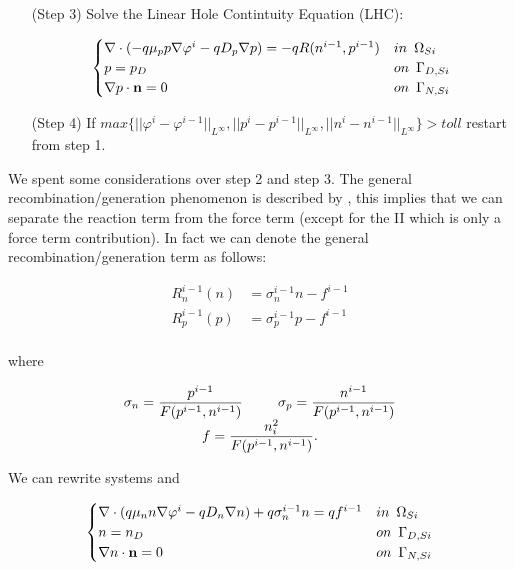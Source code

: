 \begin{itemize}
\item[(Step 3)] Solve the Linear Hole Contintuity Equation (LHC):

\begin{equation}
\label{eq: LHC system}
\begin{cases}
\nabla \cdot (- q\mu_p p \nabla \varphi^i - qD_p \nabla p ) =  -qR(n^{i-1},p^{i-1}) & in \psp{3} \Omega_{Si}
\\
 p = p_D & on \psp{3} \Gamma_{D,Si}
 \\
 \nabla p \cdot \vect{n} = 0 & on \psp{3} \Gamma_{N,Si}
\end{cases}
\end{equation}

\item[(Step 4)] If $max\{||\varphi^i-\varphi^{i-1}||_{L^{\infty}},||p^i-p^{i-1}||_{L^{\infty}},||n^i-n^{i-1}||_{L^{\infty}}\}>toll$ restart from step 1.


\end{itemize}

We spent some considerations over step 2 and step 3. The general recombination/generation phenomenon is described by , this implies that we can separate the reaction term from the force term (except for the II which is only a force term contribution). In fact we can denote the general recombination/generation term as follows:

\begin{equation}
\label{eq: real Rn and Rp}
\begin{array}{rcl}
R_n^{i-1}(n) & = \sigma_n^{i-1} n - f^{i-1} \\
R_p^{i-1}(p) & = \sigma_p^{i-1} p - f^{i-1} \\
\end{array}
\end{equation}

where


\begin{equation}
\begin{array}{c}
\sigma_n  = \dfrac{p^{i-1}}{F(p^{i-1},n^{i-1})} \psp{15} \sigma_p   = \dfrac{n^{i-1}}{F(p^{i-1},n^{i-1})} \\
f  = \dfrac{n_i^2}{F(p^{i-1},n^{i-1})}.
\end{array}
\end{equation}

We can rewrite systems  and 

\begin{equation}
\label{eq: LEC system new}
\begin{cases}
 \nabla \cdot ( q\mu_n n \nabla \varphi^i - qD_n \nabla n ) +q\sigma_n^{i-1} n = qf^{i-1} & in \psp{3} \Omega_{Si}
 \\
 n = n_D & on \psp{3} \Gamma_{D,Si}
 \\
 \nabla n \cdot \vect{n} = 0 & on \psp{3} \Gamma_{N,Si}
\end{cases}
\end{equation}

